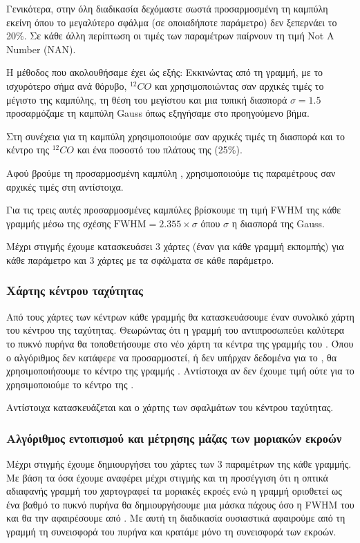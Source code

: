 \documentclass[a4paper,12pt]{memoir}
\begin{document}
Γενικότερα, στην όλη διαδικασία δεχόμαστε σωστά προσαρμοσμένη τη καμπύλη εκείνη όπου το μεγαλύτερο σφάλμα (σε οποιαδήποτε παράμετρο) δεν ξεπερνάει το 20\%. Σε κάθε άλλη περίπτωση οι τιμές των παραμέτρων παίρνουν τη τιμή Not A Number (NAN).

Η μέθοδος που ακολουθήσαμε έχει ώς εξής: Εκκινώντας από τη γραμμή, με το ισχυρότερο σήμα ανά θόρυβο, $^{12}CO$ και χρησιμοποιώντας σαν αρχικές τιμές το μέγιστο της καμπύλης, τη θέση του μεγίστου και μια τυπική διασπορά $\sigma =1.5$ προσαρμόζαμε τη καμπύλη Gauss όπως εξηγήσαμε στο προηγούμενο βήμα. 

Στη συνέχεια για τη καμπύλη  χρησιμοποιούμε σαν αρχικές τιμές τη διασπορά και το κέντρο της $^{12}CO$ και ένα ποσοστό του πλάτους της (25\%).

Αφού βρούμε τη προσαρμοσμένη καμπύλη , χρησιμοποιούμε τις παραμέτρους σαν αρχικές τιμές στη  αντίστοιχα.

Για τις τρεις αυτές προσαρμοσμένες καμπύλες βρίσκουμε τη τιμή FWHM της κάθε γραμμής μέσω της σχέσης $\text{FWHM}=2.355 \times \sigma$ όπου $\sigma$ η διασπορά της Gauss.

Μέχρι στιγμής έχουμε κατασκευάσει 3 χάρτες (έναν για κάθε γραμμή εκπομπής) για κάθε παράμετρο και 3 χάρτες με τα σφάλματα σε κάθε παράμετρο.


\subsubsection{Χάρτης κέντρου ταχύτητας}
Από τους χάρτες των κέντρων κάθε γραμμής θα κατασκευάσουμε έναν συνολικό χάρτη του κέντρου της ταχύτητας. Θεωρώντας ότι η γραμμή του  αντιπροσωπεύει καλύτερα το πυκνό πυρήνα θα τοποθετήσουμε στο νέο χάρτη τα κέντρα της γραμμής του . Όπου ο αλγόριθμος δεν κατάφερε να προσαρμοστεί, ή δεν υπήρχαν δεδομένα για το , θα χρησιμοποιήσουμε το κέντρο της γραμμής . Αντίστοιχα αν δεν έχουμε τιμή ούτε για το  χρησιμοποιούμε το κέντρο της .

Αντίστοιχα κατασκευάζεται και ο χάρτης των σφαλμάτων του κέντρου ταχύτητας.



\subsubsection{Αλγόριθμος εντοπισμού και μέτρησης μάζας των μοριακών εκροών}
Μέχρι στιγμής έχουμε δημιουργήσει του χάρτες των 3 παραμέτρων της κάθε γραμμής. Με βάση τα όσα έχουμε αναφέρει μέχρι στιγμής και τη προσέγγιση ότι η οπτικά αδιαφανής γραμμή του  χαρτογραφεί τα μοριακές εκροές ενώ η γραμμή  οριοθετεί ως ένα βαθμό το πυκνό πυρήνα θα δημιουργήσουμε μια μάσκα πάχους όσο η FWHM του  και θα την αφαιρέσουμε από . Με αυτή τη διαδικασία ουσιαστικά αφαιρούμε από τη γραμμή  τη συνεισφορά του πυρήνα και κρατάμε μόνο τη συνεισφορά των εκροών.
\end{document}
